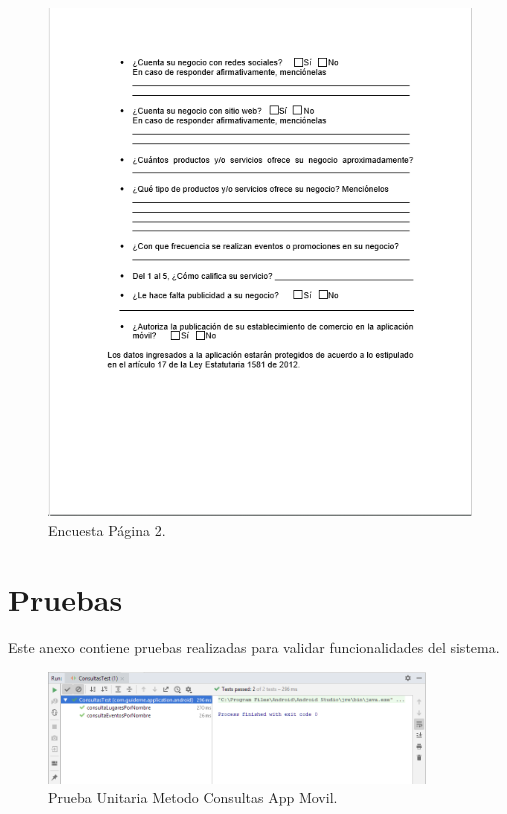 \documentclass[12pt,letterpaper,openany]{book}
\begin{document}
\begin{figure}[H]
\begin{center}
\includegraphics[width=12cm]{./imagenes/Encuesta2}
\caption{Encuesta Página 2.}
\end{center}
\end{figure}





\chapter{Pruebas}\label{aped.D}
Este anexo contiene pruebas realizadas para validar funcionalidades del sistema.	
\begin{figure}[H]
\begin{center}
\includegraphics[width=10cm]{./imagenes/Test/ConsultasTest}
\caption{Prueba Unitaria Metodo Consultas App Movil.}
\end{center}
\end{figure}
\end{document}
